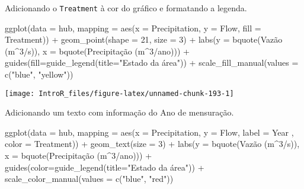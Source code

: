 \documentclass[
]{book}
\newenvironment{Shaded}{\begin{snugshade}}{\end{snugshade}}
\newcommand{\AttributeTok}[1]{\textcolor[rgb]{0.77,0.63,0.00}{#1}}
\newcommand{\DecValTok}[1]{\textcolor[rgb]{0.00,0.00,0.81}{#1}}
\newcommand{\FunctionTok}[1]{\textcolor[rgb]{0.00,0.00,0.00}{#1}}
\newcommand{\NormalTok}[1]{#1}
\newcommand{\SpecialCharTok}[1]{\textcolor[rgb]{0.00,0.00,0.00}{#1}}
\newcommand{\StringTok}[1]{\textcolor[rgb]{0.31,0.60,0.02}{#1}}
\begin{document}
Adicionando o \texttt{Treatment} à cor do gráfico e formatando a legenda.

\begin{Shaded}
\begin{Highlighting}[]
\FunctionTok{ggplot}\NormalTok{(}\AttributeTok{data =}\NormalTok{ hub, }\AttributeTok{mapping =} \FunctionTok{aes}\NormalTok{(}\AttributeTok{x =}\NormalTok{ Precipitation, }\AttributeTok{y =}\NormalTok{ Flow, }\AttributeTok{fill =}\NormalTok{ Treatment)) }\SpecialCharTok{+}
  \FunctionTok{geom\_point}\NormalTok{(}\AttributeTok{shape =} \DecValTok{21}\NormalTok{, }\AttributeTok{size =} \DecValTok{3}\NormalTok{) }\SpecialCharTok{+}
  \FunctionTok{labs}\NormalTok{(}\AttributeTok{y =} \FunctionTok{bquote}\NormalTok{(Vazão (m}\SpecialCharTok{\^{}}\DecValTok{3}\SpecialCharTok{/}\NormalTok{s)),}
       \AttributeTok{x =} \FunctionTok{bquote}\NormalTok{(Precipitação (m}\SpecialCharTok{\^{}}\DecValTok{3}\SpecialCharTok{/}\NormalTok{ano))) }\SpecialCharTok{+}
  \FunctionTok{guides}\NormalTok{(}\AttributeTok{fill=}\FunctionTok{guide\_legend}\NormalTok{(}\AttributeTok{title=}\StringTok{"Estado da área"}\NormalTok{)) }\SpecialCharTok{+}
  \FunctionTok{scale\_fill\_manual}\NormalTok{(}\AttributeTok{values =} \FunctionTok{c}\NormalTok{(}\StringTok{"blue"}\NormalTok{, }\StringTok{"yellow"}\NormalTok{))}
\end{Highlighting}
\end{Shaded}

\begin{center}\texttt{[image: IntroR\_files/figure-latex/unnamed-chunk-193-1]} \end{center}

Adicionando um texto com informação do Ano de mensuração.

\begin{Shaded}
\begin{Highlighting}[]
\FunctionTok{ggplot}\NormalTok{(}\AttributeTok{data =}\NormalTok{ hub, }\AttributeTok{mapping =} \FunctionTok{aes}\NormalTok{(}\AttributeTok{x =}\NormalTok{ Precipitation, }\AttributeTok{y =}\NormalTok{ Flow, }\AttributeTok{label =}\NormalTok{ Year}
\NormalTok{                                 , }\AttributeTok{color =}\NormalTok{ Treatment)) }\SpecialCharTok{+}
  \FunctionTok{geom\_text}\NormalTok{(}\AttributeTok{size =} \DecValTok{3}\NormalTok{) }\SpecialCharTok{+}
  \FunctionTok{labs}\NormalTok{(}\AttributeTok{y =} \FunctionTok{bquote}\NormalTok{(Vazão (m}\SpecialCharTok{\^{}}\DecValTok{3}\SpecialCharTok{/}\NormalTok{s)),}
       \AttributeTok{x =} \FunctionTok{bquote}\NormalTok{(Precipitação (m}\SpecialCharTok{\^{}}\DecValTok{3}\SpecialCharTok{/}\NormalTok{ano))) }\SpecialCharTok{+}
  \FunctionTok{guides}\NormalTok{(}\AttributeTok{color=}\FunctionTok{guide\_legend}\NormalTok{(}\AttributeTok{title=}\StringTok{"Estado da área"}\NormalTok{)) }\SpecialCharTok{+}
  \FunctionTok{scale\_color\_manual}\NormalTok{(}\AttributeTok{values =} \FunctionTok{c}\NormalTok{(}\StringTok{"blue"}\NormalTok{, }\StringTok{"red"}\NormalTok{))}
\end{Highlighting}
\end{Shaded}
\end{document}
